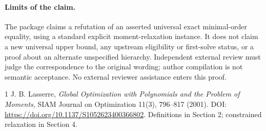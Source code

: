 \documentclass[11pt]{article}
\begin{document}
\paragraph{Limits of the claim.}
The package claims a refutation of an asserted universal exact minimal-order equality, using a standard explicit moment-relaxation instance. It does not claim a new universal upper bound, any upstream eligibility or first-solve status, or a proof about an alternate unspecified hierarchy. Independent external review must judge the correspondence to the original wording; author compilation is not semantic acceptance. No external reviewer assistance enters this proof.

\begin{thebibliography}{1}
 J. B. Lasserre, \emph{Global Optimization with Polynomials and the Problem of Moments}, SIAM Journal on Optimization 11(3), 796--817 (2001). DOI: \url{https://doi.org/10.1137/S1052623400366802}. Definitions in Section 2; constrained relaxation in Section 4.
\end{thebibliography}
\end{document}
